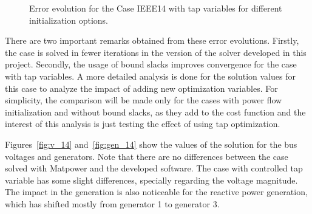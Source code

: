 \begin{figure}[H]
    \caption{Error evolution for the Case IEEE14 with tap variables for different initialization options.}
    \label{fig:case14_tap_error}
\end{figure}

There are two important remarks obtained from these error evolutions. Firstly, the case is solved in fewer iterations in the version of the solver developed in this project. Secondly, the usage of bound slacks improves convergence for the case with tap variables.
A more detailed analysis is done for the solution values for this case to analyze the impact of adding new optimization variables. For simplicity, the comparison will be made only for the cases with power flow initialization and without bound slacks, 
as they add to the cost function and the interest of this analysis is just testing the effect of using tap optimization.

Figures~\ref{fig:v_14} and~\ref{fig:gen_14} show the values of the solution for the bus voltages and generators. Note that there are no differences between the case solved with Matpower and the developed software.
The case with controlled tap variable has some slight differences, specially regarding the voltage magnitude. The impact in the generation is also noticeable for the reactive power generation, which has shifted mostly from generator 1 to generator 3.


